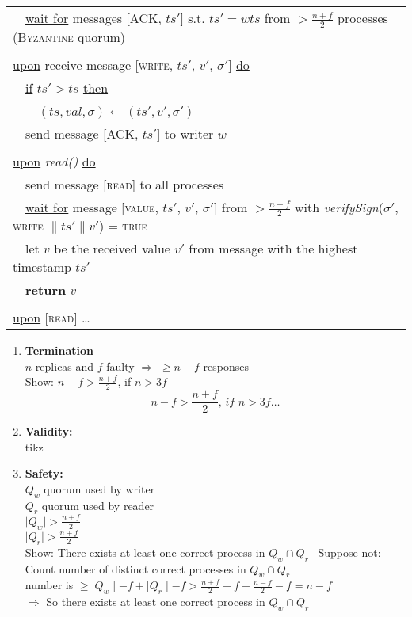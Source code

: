 \documentclass{article}
\begin{document}
\begin{adjustwidth}{2em}{2em}
\begin{adjustwidth}{2em}{2em}
\begin{adjustwidth}{2em}{}
\begin{center}
\begin{tabular}{l}
						\ \ \underline{wait for} messages [\textsc{ACK}, $ts'$] s.t. $ts'=wts$ from $> \frac{n+f}{2}$ processes (\textsc{Byzantine} quorum) \\
						\\
						\underline{upon} receive message [\textsc{write}, $ts'$, $v'$, $\sigma '$] \underline{do} \\
						\ \ \underline{if} $ts' > ts$ \underline{then} \\
						\ \ \ \ $(ts, val, \sigma) \leftarrow (ts', v', \sigma ')$ \\
						\ \ send message [\textsc{ACK}, $ts'$] to writer $w$ \\
						\\
						\underline{upon} \textit{read()} \underline{do} \\
						\ \ send message [\textsc{read}] to all processes \\
						\ \ \underline{wait for} message [\textsc{value}, $ts'$, $v'$, $\sigma '$] from $> \frac{n+f}{2}$ with \textit{verifySign}($\sigma'$, \textsc{write} $\| ts' \| v'$) = \textsc{true} \\
						\ \ let $v$ be the received value $v'$ from message with the highest timestamp $ts'$ \\
						\ \ \textbf{return} $v$ \\
						\\
						\underline{upon} [\textsc{read}] \ldots					
					\end{tabular}
				\end{center}
				\newpage
				\begin{enumerate}[-]
					\item \textbf{Termination} \\
					$n$ replicas and $f$ faulty $\Rightarrow$ $\geq n-f$ responses \\
					\underline{Show:} $n-f > \frac{n+f}{2}$, if $n > 3f$\\
					\[
						n-f > \frac{n+f}{2} \textit{, if } n > 3f \ldots
					\]
					\item \textbf{Validity:} \\
					tikz
					\item \textbf{Safety:} \\
					$Q_w$ quorum used by writer \\
					$Q_r$ quorum used by reader \\
					$\mid Q_w \mid > \frac{n+f}{2}$ \\
					$\mid Q_r \mid > \frac{n+f}{2}$ \\
					\underline{Show:} There exists at least one correct process in $Q_w \cap Q_r$ \
					Suppose not: \\
					Count number of distinct correct processes in $Q_w \cap Q_r$ \\
					number is $\geq \mid Q_w \mid - f + \mid Q_r \mid - f > \frac{n+f}{2} - f + \frac{n-f}{2} - f = n - f$ \\
					$\Rightarrow$ So there exists at least one correct process in $Q_w \cap Q_r$
				\end{enumerate}
			\end{adjustwidth}

\end{adjustwidth}
\end{adjustwidth}
\end{document}
